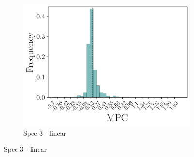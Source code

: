 \begin{figure}[t]
\begin{subfigure}{0.33\linewidth}
        \includegraphics[width=\linewidth]{figures/distributions/spec3_lin_chNDexp.png}
        \caption{Spec 3 - linear}
    \end{subfigure}\hfill
    

\end{figure}
